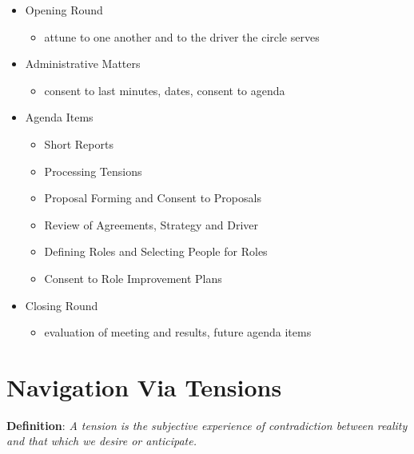 \begin{itemize}
\item Opening Round

\begin{itemize}
\item attune to one another and to the driver the circle serves

\end{itemize}

\item Administrative Matters

\begin{itemize}
\item consent to last minutes, dates, consent to agenda

\end{itemize}

\item Agenda Items

\begin{itemize}
\item Short Reports

\item Processing Tensions

\item Proposal Forming and Consent to Proposals

\item Review of Agreements, Strategy and Driver

\item Defining Roles and Selecting People for Roles

\item Consent to Role Improvement Plans

\end{itemize}

\item Closing Round

\begin{itemize}
\item evaluation of meeting and results, future agenda items

\end{itemize}

\end{itemize}

\section{Navigation Via Tensions}
\label{navigationviatensions}

\textbf{Definition}: \emph{A tension is the subjective experience of contradiction between reality and that which we desire or anticipate.}


